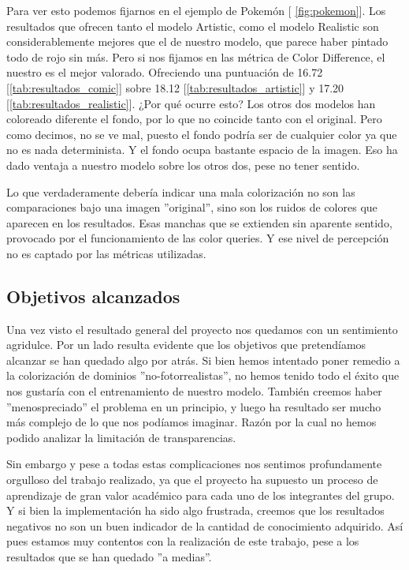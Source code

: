\documentclass[a4paper]{article}
\begin{document}
Para ver esto podemos fijarnos en el ejemplo de Pokemón [ \ref{fig:pokemon}]. Los resultados que ofrecen tanto el modelo Artistic, como el modelo Realistic son considerablemente mejores que el de nuestro modelo, que parece haber pintado todo de rojo sin más. Pero si nos fijamos en las métrica de Color Difference, el nuestro es el mejor valorado. Ofreciendo una puntuación de 16.72  [\ref{tab:resultados_comic}] sobre 18.12 [\ref{tab:resultados_artistic}] y 17.20 [\ref{tab:resultados_realistic}]. ¿Por qué ocurre esto? Los otros dos modelos han coloreado diferente el fondo, por lo que no coincide tanto con el original. Pero como decimos, no se ve mal, puesto el fondo podría ser de cualquier color ya que no es nada determinista. Y el fondo ocupa bastante espacio de la imagen. Eso ha dado ventaja a nuestro modelo sobre los otros dos, pese no tener sentido.


Lo que verdaderamente debería indicar una mala colorización no son las comparaciones bajo una imagen ''original'', sino son los ruidos de colores que aparecen en los resultados. Esas manchas que se extienden sin aparente sentido, provocado por el funcionamiento de las color queries. Y ese nivel de percepción no es captado por las métricas utilizadas.

\subsection{Objetivos alcanzados}

Una vez visto el resultado general del proyecto nos quedamos con un sentimiento agridulce. Por un lado resulta evidente que los objetivos que pretendíamos alcanzar se han quedado algo por atrás. Si bien hemos intentado poner remedio a la colorización de dominios ''no-fotorrealistas'', no hemos tenido todo el éxito que nos gustaría con el entrenamiento de nuestro modelo. También creemos haber ''menospreciado'' el problema en un principio, y luego ha resultado ser mucho más complejo de lo que nos podíamos imaginar. Razón por la cual no hemos podido analizar la limitación de transparencias.

Sin embargo y pese a todas estas complicaciones nos sentimos profundamente orgulloso del trabajo realizado, ya que el proyecto ha supuesto un proceso de aprendizaje de gran valor académico para cada uno de los integrantes del grupo. Y si bien la implementación ha sido algo frustrada, creemos que los resultados negativos no son un buen indicador de la cantidad de conocimiento adquirido. Así pues estamos muy contentos con la realización de este trabajo, pese a los resultados que se han quedado ''a medias''.
\end{document}
